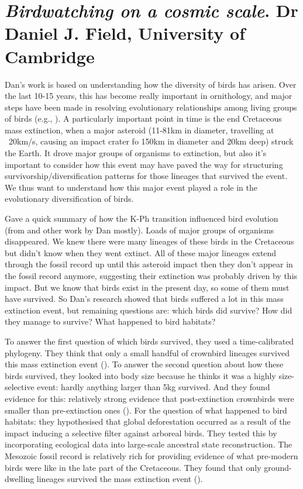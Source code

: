 \documentclass[9pt]{article}
\begin{document}
	\section{\textit{Birdwatching on a cosmic scale}. Dr Daniel J. Field, University of Cambridge}
	
	Dan's work is based on understanding how the diversity of birds has arisen. Over the last 10-15 years, this has become really important in ornithology, and major steps have been made in resolving evolutionary relationships among living groups of birds (e.g., \cite{prum2015comprehensive}). A particularly important point in time is the end Cretaceous mass extinction, when a major asteroid (11-81km in diameter, travelling at ~20km/s, causing an impact crater fo 150km in diameter and 20km deep) struck the Earth. It drove major groups of organisms to extinction, but also it's important to consider how this event may have paved the way for structuring survivorship/diversification patterns for those lineages that survived the event. We thus want to understand how this major event played a role in the evolutionary diversification of birds. 
	
	Gave a quick summary of how the K-Ph transition influenced bird evolution (from \cite{longrich2011mass} and other work by Dan mostly). Loads of major groups of organisms disappeared. We knew there were many lineages of these birds in the Cretaceous but didn't know when they went extinct. All of these major lineages extend through the fossil record up until this asteroid impact then they don't appear in the fossil record anymore, suggesting their extinction was probably driven by this impact. But we know that birds exist in the present day, so some of them must have survived. So Dan's research showed that birds suffered a lot in this mass extinction event, but remaining questions are: which birds did survive? How did they manage to survive? What happened to bird habitats?
	
	To answer the first question of which birds survived, they used a time-calibrated phylogeny. They think that only a small handful of crownbird lineages survived this mass extinction event (\cite{longrich2011mass}). To answer the second question about how these birds survived, they looked into body size because he thinks it was a highly size-selective event: hardly anything larger than 5kg survived. And they found evidence for this: relatively strong evidence that post-extinction crownbirds were smaller than pre-extinction ones (\cite{berv2018genomic}). For the question of what happened to bird habitats: they hypothesised that global deforestation occurred as a result of the impact inducing a selective filter against arboreal birds. They tested this by incorporating ecological data into large-scale ancestral state reconstruction. The Mesozoic fossil record is relatively rich for providing evidence of what pre-modern birds were like in the late part of the Cretaceous. They found that only ground-dwelling lineages survived the mass extinction event (\cite{field2018early}).
	
\end{document}
